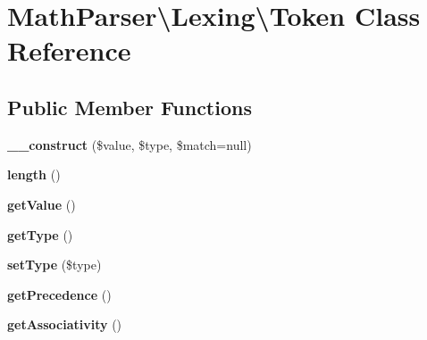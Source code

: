 \hypertarget{classMathParser_1_1Lexing_1_1Token}{\section{Math\-Parser\textbackslash{}Lexing\textbackslash{}Token Class Reference}
\label{classMathParser_1_1Lexing_1_1Token}
}
\subsection*{Public Member Functions}
\begin{DoxyCompactItemize}
\item 
\hypertarget{classMathParser_1_1Lexing_1_1Token_a45ded5abf4fef1a2e8938f71d8864491}{{\bfseries \-\_\-\-\_\-construct} (\$value, \$type, \$match=null)}\label{classMathParser_1_1Lexing_1_1Token_a45ded5abf4fef1a2e8938f71d8864491}

\item 
\hypertarget{classMathParser_1_1Lexing_1_1Token_abdd998ce6d440c0773fa7fa3616cf79b}{{\bfseries length} ()}\label{classMathParser_1_1Lexing_1_1Token_abdd998ce6d440c0773fa7fa3616cf79b}

\item 
\hypertarget{classMathParser_1_1Lexing_1_1Token_a1dac568b5f1008243edcf1b00d13cf42}{{\bfseries get\-Value} ()}\label{classMathParser_1_1Lexing_1_1Token_a1dac568b5f1008243edcf1b00d13cf42}

\item 
\hypertarget{classMathParser_1_1Lexing_1_1Token_a695571048ecc4c9bab3c742a676fac67}{{\bfseries get\-Type} ()}\label{classMathParser_1_1Lexing_1_1Token_a695571048ecc4c9bab3c742a676fac67}

\item 
\hypertarget{classMathParser_1_1Lexing_1_1Token_a4069da9eb9c24e1e3b7deafc43d5af1a}{{\bfseries set\-Type} (\$type)}\label{classMathParser_1_1Lexing_1_1Token_a4069da9eb9c24e1e3b7deafc43d5af1a}

\item 
\hypertarget{classMathParser_1_1Lexing_1_1Token_abbb8a5b874586940b6023c53233149b0}{{\bfseries get\-Precedence} ()}\label{classMathParser_1_1Lexing_1_1Token_abbb8a5b874586940b6023c53233149b0}

\item 
\hypertarget{classMathParser_1_1Lexing_1_1Token_ad3f1b618049f80f771f5e655841d06e7}{{\bfseries get\-Associativity} ()}\label{classMathParser_1_1Lexing_1_1Token_ad3f1b618049f80f771f5e655841d06e7}


\end{DoxyCompactItemize}
